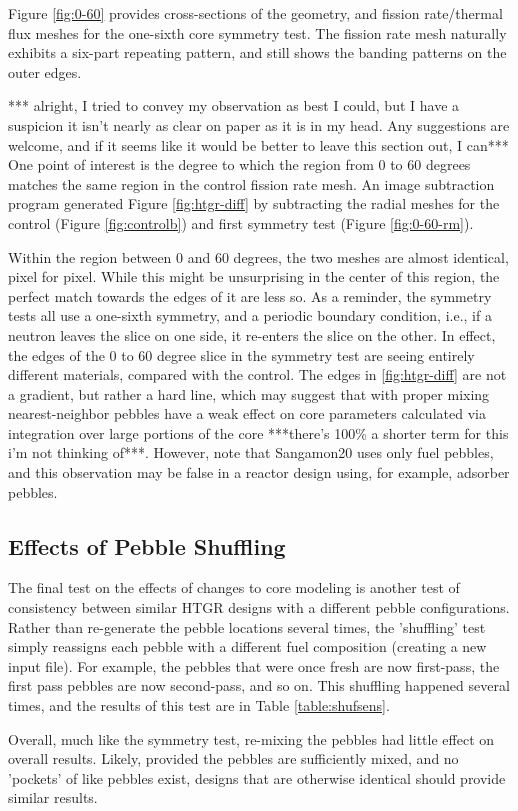 Figure \ref{fig:0-60} provides cross-sections of the geometry, and fission rate/thermal flux meshes for the one-sixth core symmetry test.  The fission rate mesh naturally exhibits a six-part repeating pattern, and still shows the banding patterns on the outer edges. 



*** alright, I tried to convey my observation as best I could, but I have a suspicion it isn't nearly as clear on paper as it is in my head.  Any suggestions are welcome, and if it seems like it would be better to leave this section out, I can***
One point of interest is the degree to which the region from 0 to 60 degrees matches the same region in the control fission rate mesh.  An image subtraction program generated Figure \ref{fig:htgr-diff} by subtracting the radial meshes for the control (Figure \ref{fig:controlb}) and first symmetry test (Figure \ref{fig:0-60-rm}).



Within the region between 0 and 60 degrees, the two meshes are almost identical, pixel for pixel.  While this might be unsurprising in the center of this region, the perfect match towards the edges of it are less so.  As a reminder, the symmetry tests all use a one-sixth symmetry, and a periodic boundary condition, i.e., if a neutron leaves the slice on one side, it re-enters the slice on the other.  In effect, the edges of the 0 to 60 degree slice in the symmetry test are seeing entirely different materials, compared with the control.  The edges in \ref{fig:htgr-diff} are not a gradient, but rather a hard line, which may suggest that with proper mixing nearest-neighbor pebbles have a weak effect on core parameters calculated via integration over large portions of the core ***there's 100\% a shorter term for this i'm not thinking of***.  However, note that Sangamon20 uses only fuel pebbles, and this observation may be false in a reactor design using, for example, adsorber pebbles. 


\subsection{Effects of Pebble Shuffling}

The final test on the effects of changes to core modeling is another test of consistency between similar HTGR designs with a different pebble configurations.  Rather than re-generate the pebble locations several times, the 'shuffling' test simply reassigns each pebble with a different fuel composition (creating a new input file).  For example, the pebbles that were once fresh are now first-pass, the first pass pebbles are now second-pass, and so on.  This shuffling happened several times, and the results of this test are in Table \ref{table:shufsens}.



Overall, much like the symmetry test, re-mixing the pebbles had little effect on overall results.  Likely, provided the pebbles are sufficiently mixed, and no 'pockets' of like pebbles exist, designs that are otherwise identical should provide similar results. 